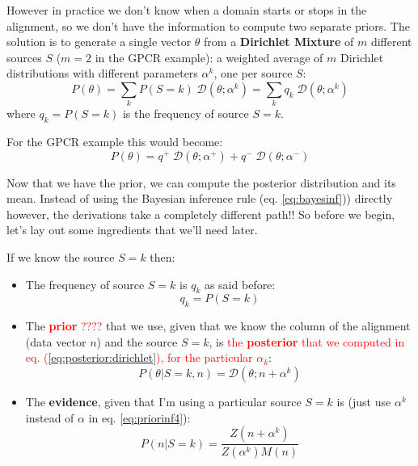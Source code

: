 However in practice we don't know when a domain starts or stops in the alignment, so we don't have the information to compute two separate priors. The solution is to generate a single vector $\theta$ from a {\bf Dirichlet Mixture} of $m$ different sources $S$ ($m=2$ in the GPCR example): a weighted average of $m$ Dirichlet distributions with different parameters $\alpha^k$, one per source $S$:
%
\begin{equation}
P(\theta) = 
\sum_k P(S=k) \; \mathcal{D}(\theta ; \alpha^k) =
\sum_k q_k \; \mathcal{D}(\theta ; \alpha^k)
\end{equation}
where $q_k = P(S=k)$ is the frequency of source $S=k$.

For the GPCR example this would become:
\begin{equation}
P(\theta) = 
q^+ \; \mathcal{D}(\theta ; \alpha^+) + q^- \; \mathcal{D}(\theta ; \alpha^-)
\end{equation}

Now that we have the prior, we can compute the posterior distribution and its mean. Instead of using the Bayesian inference rule (eq. \ref{eq:bayesinf})) directly however, the derivations take a completely different path!! So before we begin, let's lay out some ingredients that we'll need later.

If we know the source $S=k$ then:
\begin{itemize}
\item The frequency of source $S=k$ is $q_k$ as said before:
\begin{equation}
q_k = P(S=k)
\label{eq:mix:qk}
\end{equation}
%
\item The \textcolor{red}{{\bf prior} ????} that we use, given that we know the column of the alignment (data vector $n$) and the source $S=k$, is \textcolor{red}{the {\bf posterior} that we computed in eq. (\ref{eq:posterior:dirichlet}), for the particular $\alpha_k$}:
\begin{equation}
P(\theta|S=k, n) = \mathcal{D}(\theta; n + \alpha^k)
\label{eq:mix:thetaskn}
\end{equation}
%
\item The {\bf evidence}, given that I'm using a particular source $S=k$ is (just use $\alpha^k$ instead of $\alpha$ in eq. \ref{eq:priorinf4}):
\begin{equation}
P(n|S=k) = \frac{Z(n + \alpha^k)}{Z(\alpha^k) M(n)}
\label{eq:mix:evid}
\end{equation}
\end{itemize}

